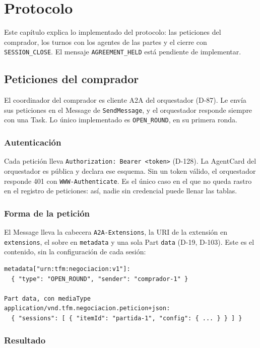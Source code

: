 \chapter{Protocolo}

Este capítulo explica lo implementado del protocolo: las peticiones del comprador, los turnos con los agentes de las partes y el cierre con \texttt{SESSION\_CLOSE}. El mensaje \texttt{AGREEMENT\_HELD} está pendiente de implementar.

\section{Peticiones del comprador}

El coordinador del comprador es cliente A2A del orquestador (D-87). Le envía sus peticiones en el Message de \texttt{SendMessage}, y el orquestador responde siempre con una Task. Lo único implementado es \texttt{OPEN\_ROUND}, en su primera ronda.

\subsection{Autenticación}

Cada petición lleva \texttt{Authorization: Bearer <token>} (D-128). La AgentCard del orquestador es pública y declara ese esquema. Sin un token válido, el orquestador responde 401 con \texttt{WWW-Authenticate}. Es el único caso en el que no queda rastro en el registro de peticiones: así, nadie sin credencial puede llenar las tablas.

\subsection{Forma de la petición}

El Message lleva la cabecera \texttt{A2A-Extensions}, la URI de la extensión en \texttt{extensions}, el sobre en \texttt{metadata} y una sola Part \texttt{data} (D-19, D-103). Este es el contenido, sin la configuración de cada sesión:

\begin{verbatim}
metadata["urn:tfm:negociacion:v1"]:
  { "type": "OPEN_ROUND", "sender": "comprador-1" }

Part data, con mediaType
application/vnd.tfm.negociacion.peticion+json:
  { "sessions": [ { "itemId": "partida-1", "config": { ... } } ] }
\end{verbatim}

\subsection{Resultado}

